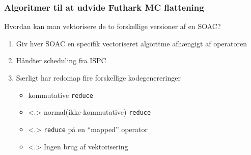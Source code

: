 \documentclass[t]{beamer}
\begin{document}
\begin{frame}
  \frametitle{Algoritmer til at udvide Futhark MC flattening}
  Hvordan kan man vektorisere de to forskellige versioner af en SOAC?
  \begin{enumerate}
  \item<+-> Giv hver SOAC en specifik vectoriseret algoritme afhængigt af operatoren
  \item<+-> Håndter scheduling fra ISPC
  \item<+-> Særligt har redomap fire forskellige kodegenereringer
    \begin{itemize}
    \item<+-> kommutative \texttt{reduce}
    \item<.> normal(ikke kommutative) \texttt{reduce}
    \item<.> \texttt{reduce} på en ``mapped'' operator
    \item<.> Ingen brug af vektorisering
    \end{itemize}
  \end{enumerate}
\end{frame}
\end{document}

